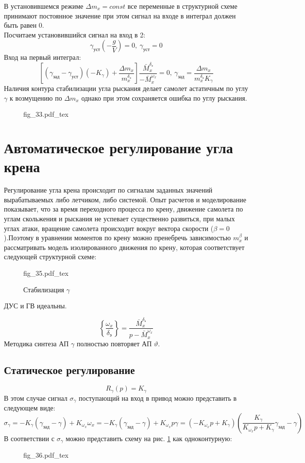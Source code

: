 \documentclass{article}
\begin{document}
В установившемся режиме $\Delta m_x = const$ все переменные в структурной схеме
принимают постоянное значение при этом сигнал на входе в интеграл должен быть
равен 0.\\
Посчитаем установившийся сигнал на вход в 2:
\[
	\gamma_\text{уст}(-\frac{g}{V}) = 0,\ \gamma_\text{уст} = 0
\]
Вход на первый интеграл:
\[
	\left[(\gamma_\text{зад} - \gamma_\text{уст})(-K_\gamma)+\frac{\Delta
	m_x}{m_x^{\delta_\text{э}}}\right]\frac{\bar{M}_x^{\delta_\text{э}}}{-\bar{M}_x^{\omega_x}}=
	0,\ \gamma_\text{зад}=\frac{\Delta m_x}{m_x^{\delta_\text{э}}K_{\gamma}}
\]
Наличия контура стабилизации угла рыскания делает самолет астатичным по углу
$\gamma$ к возмущению по $\Delta m_x$ однако при этом сохраняется ошибка по
углу рыскания.

\begin{figure}[H]
	\centering
	{fig_33.pdf_tex}
\end{figure}

\section{Автоматическое регулирование угла крена}
Регулирование угла крена происходит по сигналам заданных значений
вырабатываемых либо летчиком, либо системой. Опыт расчетов и моделирование
показывает, что за время переходного процесса по крену, движение самолета по
углам скольжения и рыскания не успевает существенно развиться, при малых углах
атаки, вращение самолета происходит вокруг вектора скорости ($\beta =
	0$).Поэтому в уравнении моментов по крену можно пренебречь зависимостью
$m_x^\beta$ и рассматривать модель изолированного движения по крену, которая
соответствует следующей структурной схеме:

\begin{figure}[H]
	\centering
	{fig_35.pdf_tex}
	\caption{Стабилизация $\gamma$}
	\label{fig:stab_gamma}
\end{figure}
ДУС и ГВ идеальны.

\[
	\left\{\frac{\omega_x}{\delta_\text{э}} \right\}
	=\frac{\bar{M}_x^{\delta_\text{э}}}{ p - \bar{M}_x^{\omega_x}}
\]
Методика синтеза АП $\gamma$ полностью повторяет АП $\vartheta$.

\subsection{Статическое регулирование}
\[
	R_\gamma(p) = K_\gamma
\]
В этом случае сигнал $\sigma_\gamma$ поступающий на вход в привод можно
представить в следующем виде:
\[
	\sigma_\gamma =  - K_\gamma(\gamma_\text{зад} - \gamma) + K_{\omega_x}
	\omega_x = - K_{\gamma} (\gamma_\text{зад} - \gamma) + K_{\omega_x} p
	\gamma = (-K_{\omega_x} p + K_\gamma) \left(\frac{K_\gamma}{K_{\omega_x}p +
		K_\gamma} \gamma_\text{зад} - \gamma \right)
\]
В соответствии с $\sigma_\gamma$ можно представить схему на рис.
\ref{fig:stab_gamma} как одноконтурную:
\begin{figure}[H]
	\centering
	{fig_36.pdf_tex}
\end{figure}
\end{document}
